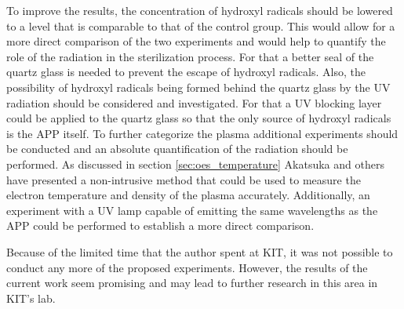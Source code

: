 To improve the results, the concentration of hydroxyl radicals should be lowered to a level that is comparable to that of the control group. This would allow for a more direct comparison of the two experiments and would help to quantify the role of the radiation in the sterilization process. For that a better seal of the quartz glass is needed to prevent the escape of hydroxyl radicals. Also, the possibility of hydroxyl radicals being formed behind the quartz glass by the UV radiation should be considered and investigated. For that a UV blocking layer could be applied to the quartz glass so that the only source of hydroxyl radicals is the APP itself. To further categorize the plasma additional experiments should be conducted and an absolute quantification of the radiation should be performed. As discussed in section \ref{sec:oes_temperature} Akatsuka and others \cite{oes_temperature} have presented a non-intrusive method that could be used to measure the electron temperature and density of the plasma accurately. Additionally, an experiment with a UV lamp capable of emitting the same wavelengths as the APP could be performed to establish a more direct comparison.

Because of the limited time that the author spent at KIT, it was not possible to conduct any more of the proposed experiments. However, the results of the current work seem promising and may lead to further research in this area in KIT's lab.